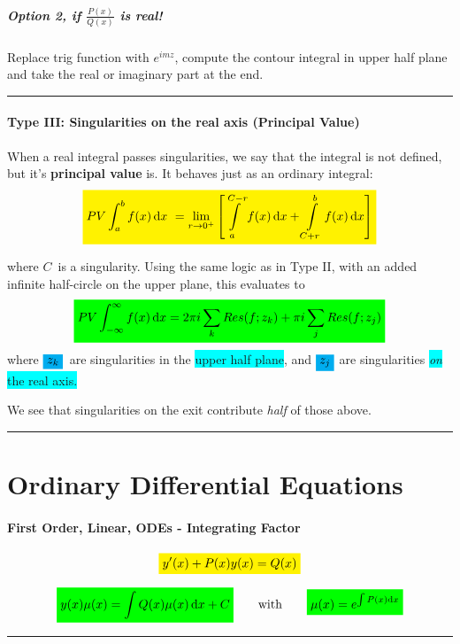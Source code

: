 \documentclass[10pt,a4paper]{article}
\renewcommand{\exp}{e^}
\newcommand{\infint}{\int_{-\infty}^{\infty}}
\newcommand{\holine}[1][\medskipamount]{\par\vspace*{\dimexpr-\parskip-\baselineskip+#1}\noindent\rule{\linewidth}{1pt}\par\vspace*{\dimexpr-\parskip-.5\baselineskip+#1}}
\newcommand{\Holine}[1][\medskipamount]{\par\vspace*{\dimexpr-\parskip-\baselineskip+#1}\noindent\rule{\linewidth}{3pt}\par\vspace*{\dimexpr-\parskip-.5\baselineskip+#1}}
\newcommand{\yl}[1]{\colorbox{yellow}{$\displaystyle #1$}}
\newcommand{\gr}[1]{\colorbox{green}{$\displaystyle #1$}}
\newcommand{\bl}[1]{\colorbox{cyan}{$\displaystyle #1$}}
\newcommand{\bll}{\colorbox{cyan}}
\begin{document}
\begin{multicols}{2}
\subsubsection*{Option 2, if $\frac{P(x)}{Q(x)}$ is real!}
Replace trig function with $\exp{imz}$, compute the contour integral in upper half plane and take the real or imaginary part at the end.


\holine
\subsection*{Type III: Singularities on the real axis (Principal Value)}
When a real integral passes singularities, we say that the integral is not defined, but it's \textbf{principal value} is. It behaves just as an ordinary integral:
\[
\yl{
    PV\int_a^b f(x) \dd{x} = \lim\limits_{r\rightarrow 0^+} \qty[\int\limits_a^{C-r} f(x) \dd{x} + \int\limits_{C+r}^b f(x) \dd{x} ]
}
\]

where $C$ is a singularity. Using the same logic as in Type II, with an added infinite half-circle on the upper plane, this evaluates to
\[
\gr{
    PV\infint f(x) \dd{x} = 2\pi i \sum_k Res(f; z_k) + \pi i \sum_j Res(f;z_j)
}
\]
where $\bl{z_k}$ are singularities in the \bll{upper half plane}, and $\bl{z_j}$ are singularities \bll{\textit{on} the real axis.}

We see that singularities on the exit contribute \textit{half} of those above.




\Holine
\part*{Ordinary Differential Equations}

\subsection*{First Order, Linear, ODEs - Integrating Factor}
\[\yl{
    y'(x) + P(x) y(x) = Q(x)
}\]

\[\gr{
    y(x)\mu(x) = \int Q(x)\mu(x) \dd{x} + C} \quad\quad\text{with}\quad\quad \gr{\mu(x) = \exp{\int P(x)\dd{x}}
}\]




\Holine

\end{multicols}
\end{document}

